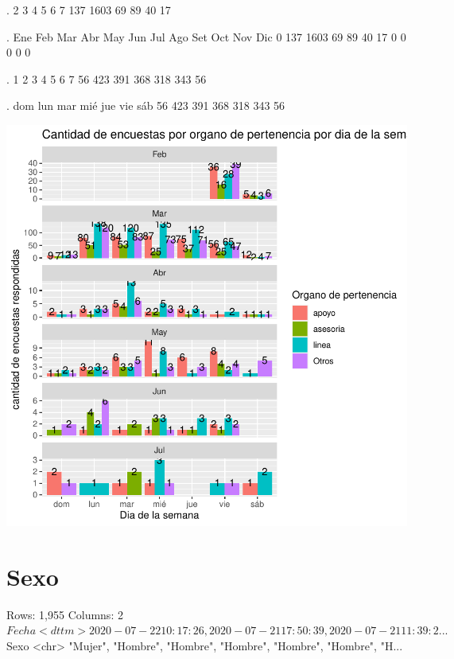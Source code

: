 \documentclass{article}
\begin{document}
\begin{Schunk}
\begin{Soutput}
.
   2    3    4    5    6    7 
 137 1603   69   89   40   17 
\end{Soutput}
\begin{Soutput}
.
 Ene  Feb  Mar  Abr  May  Jun  Jul  Ago  Set  Oct  Nov  Dic 
   0  137 1603   69   89   40   17    0    0    0    0    0 
\end{Soutput}
\begin{Soutput}
.
  1   2   3   4   5   6   7 
 56 423 391 368 318 343  56 
\end{Soutput}
\begin{Soutput}
.
dom lun mar mié jue vie sáb 
 56 423 391 368 318 343  56 
\end{Soutput}
\end{Schunk}
\includegraphics{seguimientov4-014}

\section{Sexo}

\begin{Schunk}
\begin{Soutput}
Rows: 1,955
Columns: 2
$ Fecha <dttm> 2020-07-22 10:17:26, 2020-07-21 17:50:39, 2020-07-21 11:39:2...
$ Sexo  <chr> "Mujer", "Hombre", "Hombre", "Hombre", "Hombre", "Hombre", "H...
\end{Soutput}
\end{Schunk}
\end{document}
